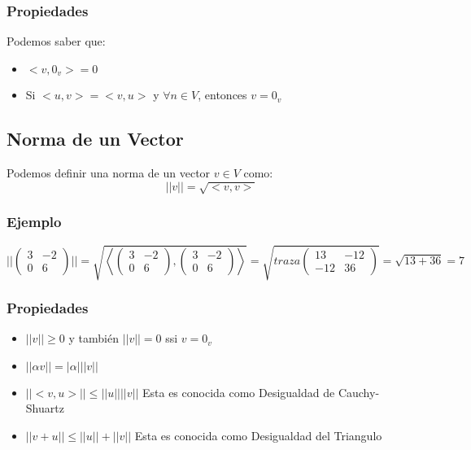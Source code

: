 \documentclass[12pt]{article}							    %
\begin{document}
\subsubsection{Propiedades}
Podemos saber que:
\begin{itemize}
    \item $<v, 0_v> = 0$
    \item Si $<u, v> = <v, u>$ y $\forall n \in V$, entonces $v = 0_v$
\end{itemize}


\subsection{Norma de un Vector}
Podemos definir una norma de un vector $v \in V$ como:
\begin{equation}
    ||v|| = \sqrt{<v,v>}
\end{equation}

\subsubsection{Ejemplo}

\begin{equation*}
    ||\begin{pmatrix} 3 & -2 \\ 0 & 6 \end{pmatrix}|| = \sqrt{ \left<  \begin{pmatrix} 3 & -2 \\ 0 & 6 \end{pmatrix}, \begin{pmatrix} 3 & -2 \\ 0 & 6 \end{pmatrix} \right>} =  \sqrt{ traza  \begin{pmatrix} 13 & -12 \\ -12 & 36 \end{pmatrix} } = \sqrt{13+36} = 7  
\end{equation*}


\subsubsection{Propiedades}
\begin{itemize}
    \item $||v|| \geq 0$ y también $||v|| = 0$ ssi $v = 0_v$   
    \item $|| \alpha v||  = |\alpha| ||v|| $
    \item $||<v, u>||  \leq ||u|| ||v|| $ Esta es conocida como Desigualdad de Cauchy-Shuartz
    \item $||v + u||  \leq ||u|| + ||v|| $ Esta es conocida como Desigualdad del Triangulo
\end{itemize}
\end{document}
